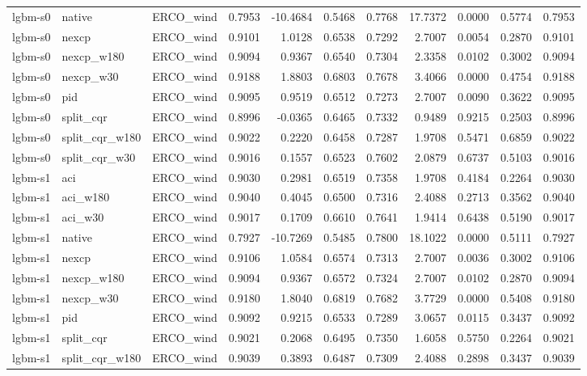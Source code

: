 \begin{tabular}{lllrrrrrrrr}
lgbm-s0 & native & ERCO_wind & 0.7953 & -10.4684 & 0.5468 & 0.7768 & 17.7372 & 0.0000 & 0.5774 & 0.7953 \\
lgbm-s0 & nexcp & ERCO_wind & 0.9101 & 1.0128 & 0.6538 & 0.7292 & 2.7007 & 0.0054 & 0.2870 & 0.9101 \\
lgbm-s0 & nexcp_w180 & ERCO_wind & 0.9094 & 0.9367 & 0.6540 & 0.7304 & 2.3358 & 0.0102 & 0.3002 & 0.9094 \\
lgbm-s0 & nexcp_w30 & ERCO_wind & 0.9188 & 1.8803 & 0.6803 & 0.7678 & 3.4066 & 0.0000 & 0.4754 & 0.9188 \\
lgbm-s0 & pid & ERCO_wind & 0.9095 & 0.9519 & 0.6512 & 0.7273 & 2.7007 & 0.0090 & 0.3622 & 0.9095 \\
lgbm-s0 & split_cqr & ERCO_wind & 0.8996 & -0.0365 & 0.6465 & 0.7332 & 0.9489 & 0.9215 & 0.2503 & 0.8996 \\
lgbm-s0 & split_cqr_w180 & ERCO_wind & 0.9022 & 0.2220 & 0.6458 & 0.7287 & 1.9708 & 0.5471 & 0.6859 & 0.9022 \\
lgbm-s0 & split_cqr_w30 & ERCO_wind & 0.9016 & 0.1557 & 0.6523 & 0.7602 & 2.0879 & 0.6737 & 0.5103 & 0.9016 \\
lgbm-s1 & aci & ERCO_wind & 0.9030 & 0.2981 & 0.6519 & 0.7358 & 1.9708 & 0.4184 & 0.2264 & 0.9030 \\
lgbm-s1 & aci_w180 & ERCO_wind & 0.9040 & 0.4045 & 0.6500 & 0.7316 & 2.4088 & 0.2713 & 0.3562 & 0.9040 \\
lgbm-s1 & aci_w30 & ERCO_wind & 0.9017 & 0.1709 & 0.6610 & 0.7641 & 1.9414 & 0.6438 & 0.5190 & 0.9017 \\
lgbm-s1 & native & ERCO_wind & 0.7927 & -10.7269 & 0.5485 & 0.7800 & 18.1022 & 0.0000 & 0.5111 & 0.7927 \\
lgbm-s1 & nexcp & ERCO_wind & 0.9106 & 1.0584 & 0.6574 & 0.7313 & 2.7007 & 0.0036 & 0.3002 & 0.9106 \\
lgbm-s1 & nexcp_w180 & ERCO_wind & 0.9094 & 0.9367 & 0.6572 & 0.7324 & 2.7007 & 0.0102 & 0.2870 & 0.9094 \\
lgbm-s1 & nexcp_w30 & ERCO_wind & 0.9180 & 1.8040 & 0.6819 & 0.7682 & 3.7729 & 0.0000 & 0.5408 & 0.9180 \\
lgbm-s1 & pid & ERCO_wind & 0.9092 & 0.9215 & 0.6533 & 0.7289 & 3.0657 & 0.0115 & 0.3437 & 0.9092 \\
lgbm-s1 & split_cqr & ERCO_wind & 0.9021 & 0.2068 & 0.6495 & 0.7350 & 1.6058 & 0.5750 & 0.2264 & 0.9021 \\
lgbm-s1 & split_cqr_w180 & ERCO_wind & 0.9039 & 0.3893 & 0.6487 & 0.7309 & 2.4088 & 0.2898 & 0.3437 & 0.9039 \\

\end{tabular}
